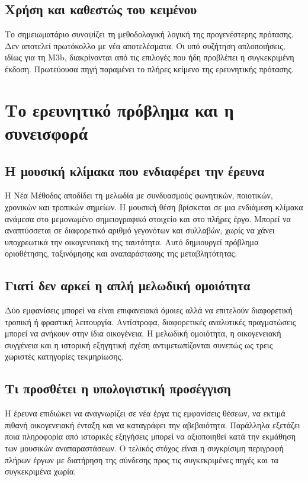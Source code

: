 \documentclass[11pt,a4paper]{extarticle}
\begin{document}
\subsection*{Χρήση και καθεστώς του κειμένου}
Το σημειωματάριο συνοψίζει τη μεθοδολογική λογική της προγενέστερης πρότασης. Δεν αποτελεί πρωτόκολλο με νέα αποτελέσματα. Οι υπό συζήτηση απλοποιήσεις, ιδίως για τη M3b, διακρίνονται από τις επιλογές που ήδη προβλέπει η συγκεκριμένη έκδοση. Πρωτεύουσα πηγή παραμένει το πλήρες κείμενο της ερευνητικής πρότασης.

\clearpage
\tableofcontents
\clearpage


\section{Το ερευνητικό πρόβλημα και η συνεισφορά}
\subsection*{Η μουσική κλίμακα που ενδιαφέρει την έρευνα}
Η Νέα Μέθοδος αποδίδει τη μελωδία με συνδυασμούς φωνητικών, ποιοτικών, χρονικών και τροπικών σημείων. Η μουσική θέση βρίσκεται σε μια ενδιάμεση κλίμακα ανάμεσα στο μεμονωμένο σημειογραφικό στοιχείο και στο πλήρες έργο. Μπορεί να αναπτύσσεται σε διαφορετικό αριθμό γεγονότων και συλλαβών, χωρίς να χάνει υποχρεωτικά την οικογενειακή της ταυτότητα. Αυτό δημιουργεί πρόβλημα οριοθέτησης, ταξινόμησης και αναπαράστασης της μεταβλητότητας.

\subsection*{Γιατί δεν αρκεί η απλή μελωδική ομοιότητα}
Δύο εμφανίσεις μπορεί να είναι επιφανειακά όμοιες αλλά να επιτελούν διαφορετική τροπική ή φραστική λειτουργία. Αντίστροφα, διαφορετικές αναλυτικές πραγματώσεις μπορεί να ανήκουν στην ίδια οικογένεια. Η μελωδική ομοιότητα, η οικογενειακή συγγένεια και η ιστορική εξηγητική σχέση αντιμετωπίζονται συνεπώς ως τρεις χωριστές κατηγορίες τεκμηρίωσης.

\subsection*{Τι προσθέτει η υπολογιστική προσέγγιση}
Η έρευνα επιδιώκει να αναγνωρίζει σε νέα έργα τις εμφανίσεις θέσεων, να εκτιμά πιθανή οικογενειακή ένταξη και να καταγράφει την αβεβαιότητα. Παράλληλα εξετάζει ποια πληροφορία από ιστορικές εξηγήσεις μπορεί να αξιοποιηθεί κατά την εκμάθηση των μουσικών αναπαραστάσεων. Ο τελικός στόχος είναι η συγκρίσιμη περιγραφή πλήρων έργων με διατήρηση της σύνδεσης προς τις συγκεκριμένες πηγές και τα συγκεκριμένα χωρία.
\end{document}
